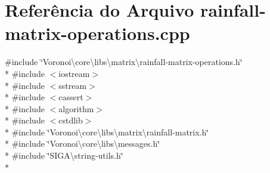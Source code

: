 \section{Referência do Arquivo rainfall-\/matrix-\/operations.cpp}
\label{rainfall-matrix-operations_8cpp}
{\ttfamily \#include \char`\"{}Voronoi\textbackslash{}core\textbackslash{}libs\textbackslash{}matrix\textbackslash{}rainfall-\/matrix-\/operations.\+h\char`\"{}}\\*
{\ttfamily \#include $<$iostream$>$}\\*
{\ttfamily \#include $<$sstream$>$}\\*
{\ttfamily \#include $<$cassert$>$}\\*
{\ttfamily \#include $<$algorithm$>$}\\*
{\ttfamily \#include $<$cstdlib$>$}\\*
{\ttfamily \#include \char`\"{}Voronoi\textbackslash{}core\textbackslash{}libs\textbackslash{}matrix\textbackslash{}rainfall-\/matrix.\+h\char`\"{}}\\*
{\ttfamily \#include \char`\"{}Voronoi\textbackslash{}core\textbackslash{}libs\textbackslash{}messages.\+h\char`\"{}}\\*
{\ttfamily \#include \char`\"{}S\+I\+G\+A\textbackslash{}string-\/utils.\+h\char`\"{}}\\*
